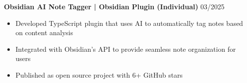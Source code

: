 \noindent
\textbf{Obsidian AI Note Tagger | Obsidian Plugin (Individual)} \hfill 03/2025
\begin{itemize}
    \item Developed TypeScript plugin that uses AI to automatically tag notes based on content analysis
    \item Integrated with Obsidian's API to provide seamless note organization for users
    \item Published as open source project with 6+ GitHub stars
\end{itemize}
